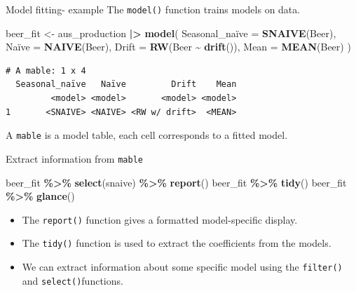 \documentclass[
  14pt,
  ignorenonframetext,
  aspectratio=169,
]{beamer}
\newenvironment{Shaded}{\begin{snugshade}}{\end{snugshade}}
\newcommand{\AttributeTok}[1]{\textcolor[rgb]{0.13,0.29,0.53}{#1}}
\newcommand{\FunctionTok}[1]{\textcolor[rgb]{0.13,0.29,0.53}{\textbf{#1}}}
\newcommand{\NormalTok}[1]{#1}
\newcommand{\OtherTok}[1]{\textcolor[rgb]{0.56,0.35,0.01}{#1}}
\newcommand{\SpecialCharTok}[1]{\textcolor[rgb]{0.81,0.36,0.00}{\textbf{#1}}}
\newcommand{\StringTok}[1]{\textcolor[rgb]{0.31,0.60,0.02}{#1}}
\providecommand{\tightlist}{%
  \setlength{\itemsep}{0pt}\setlength{\parskip}{0pt}}
\renewenvironment{Shaded}{\vspace*{0.15cm}\color{black}\fontsize{10}{10}\sf\begin{snugshade}\color{black}}{\end{snugshade}}
\begin{document}
\begin{frame}[fragile]{Model fitting- example}
\protect{}\label{model-fitting--example}
The \texttt{model()} function trains models on data.

\fontsize{10}{11}\sf

\begin{Shaded}
\begin{Highlighting}[]
\NormalTok{beer\_fit }\OtherTok{\textless{}{-}}\NormalTok{ aus\_production }\SpecialCharTok{|\textgreater{}}
  \FunctionTok{model}\NormalTok{(}
    \StringTok{\textasciigrave{}}\AttributeTok{Seasonal\_naïve}\StringTok{\textasciigrave{}} \OtherTok{=} \FunctionTok{SNAIVE}\NormalTok{(Beer),}
    \StringTok{\textasciigrave{}}\AttributeTok{Naïve}\StringTok{\textasciigrave{}} \OtherTok{=} \FunctionTok{NAIVE}\NormalTok{(Beer),}
    \AttributeTok{Drift =} \FunctionTok{RW}\NormalTok{(Beer }\SpecialCharTok{\textasciitilde{}} \FunctionTok{drift}\NormalTok{()),}
    \AttributeTok{Mean =} \FunctionTok{MEAN}\NormalTok{(Beer)}
\NormalTok{  )}
\end{Highlighting}
\end{Shaded}

\begin{verbatim}
# A mable: 1 x 4
  Seasonal_naïve   Naïve         Drift    Mean
         <model> <model>       <model> <model>
1       <SNAIVE> <NAIVE> <RW w/ drift>  <MEAN>
\end{verbatim}

\vspace*{0.2cm}\begin{alertblock}{}
A \texttt{mable} is a model table, each cell corresponds to a fitted model.
\end{alertblock}
\end{frame}

\begin{frame}[fragile]{Extract information from \texttt{mable}}
\protect{}\label{extract-information-from-mable}
\fontsize{10}{12}\sf

\begin{Shaded}
\begin{Highlighting}[]
\NormalTok{beer\_fit }\SpecialCharTok{\%\textgreater{}\%} \FunctionTok{select}\NormalTok{(snaive) }\SpecialCharTok{\%\textgreater{}\%} \FunctionTok{report}\NormalTok{()}
\NormalTok{beer\_fit }\SpecialCharTok{\%\textgreater{}\%} \FunctionTok{tidy}\NormalTok{()}
\NormalTok{beer\_fit }\SpecialCharTok{\%\textgreater{}\%} \FunctionTok{glance}\NormalTok{()}
\end{Highlighting}
\end{Shaded}

\begin{itemize}
\tightlist
\item
  The \texttt{report()} function gives a formatted model-specific
  display.
\item
  The \texttt{tidy()} function is used to extract the coefficients from
  the models.
\item
  We can extract information about some specific model using the
  \texttt{filter()} and \texttt{select()}functions.
\end{itemize}
\end{frame}
\end{document}
